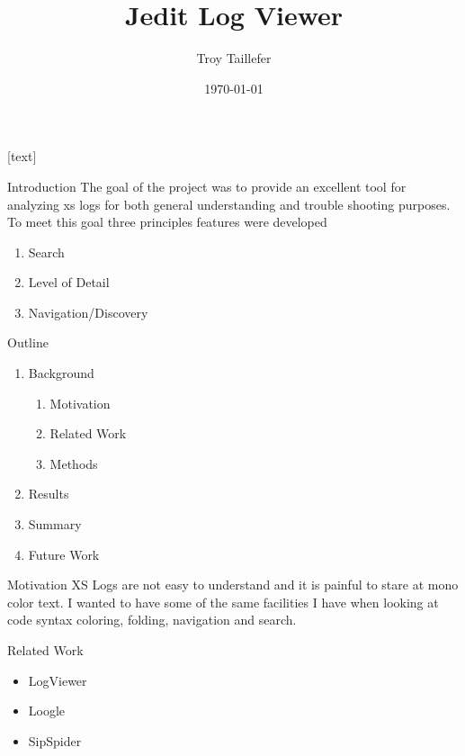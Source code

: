 \documentclass{beamer}
\title{Jedit Log Viewer}
\author{Troy Taillefer}
\institute{Broadsoft}
\date{\today}
\begin{document}
[text]
\lstset{basicstyle=\tiny,language=Java,showstringspaces=false}
\frame{\titlepage}

\begin{frame}{Introduction}
The goal of the project was to provide an excellent tool for analyzing xs logs 
for both general understanding and trouble shooting purposes. To meet this goal three
principles features were developed

\begin{enumerate}
\item Search
\item Level of Detail
\item Navigation/Discovery
\end{enumerate}
\end{frame}

\begin{frame}{Outline}
\begin{enumerate}
\item Background
\begin{enumerate}
\item Motivation
\item Related Work
\item Methods
\end{enumerate}
\item Results
\item Summary
\item Future Work
\end{enumerate}
\end{frame}


\begin{frame}{Motivation}
XS Logs are not easy to understand and 
it is painful to stare at mono color text. I wanted to have some of the same facilities
I have when looking at code syntax coloring, folding, navigation and search. 
\end{frame}

\begin{frame}{Related Work}

\begin{itemize}
\item LogViewer
\item Loogle\cite{Loogle}
\item SipSpider
\end{itemize}

\end{frame}
\end{document}
